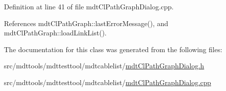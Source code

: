 Definition at line 41 of file mdt\-Cl\-Path\-Graph\-Dialog.\-cpp.



References mdt\-Cl\-Path\-Graph\-::last\-Error\-Message(), and mdt\-Cl\-Path\-Graph\-::load\-Link\-List().



The documentation for this class was generated from the following files\-:\begin{DoxyCompactItemize}
\item 
src/mdttools/mdttesttool/mdtcablelist/\hyperlink{mdt_cl_path_graph_dialog_8h}{mdt\-Cl\-Path\-Graph\-Dialog.\-h}\item 
src/mdttools/mdttesttool/mdtcablelist/\hyperlink{mdt_cl_path_graph_dialog_8cpp}{mdt\-Cl\-Path\-Graph\-Dialog.\-cpp}\end{DoxyCompactItemize}

